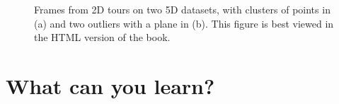 \documentclass[
  letterpaper,
]{krantz}
\begin{document}
\begin{figure}

\begin{minipage}{0.50\linewidth}



\end{minipage}%
%
\begin{minipage}{0.50\linewidth}



\end{minipage}%

\caption{\label{fig-tour-intro-pdf}Frames from 2D tours on two 5D
datasets, with clusters of points in (a) and two outliers with a plane
in (b). This figure is best viewed in the HTML version of the book.
}

\end{figure}%

\section{What can you learn?}\label{what-can-you-learn}
\end{document}
